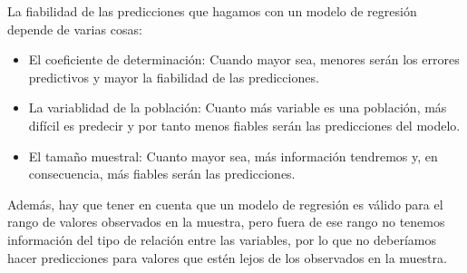 La fiabilidad de las predicciones que hagamos con un modelo de regresión depende de varias cosas:
\begin{itemize}
\item El coeficiente de determinación: Cuando mayor sea, menores serán los errores predictivos y mayor la fiabilidad de las predicciones.
\item La variablidad de la población: Cuanto más variable es una población, más difícil es predecir y por tanto menos fiables serán las predicciones del modelo.
\item El tamaño muestral: Cuanto mayor sea, más información tendremos y, en consecuencia, más fiables serán las predicciones. 
\end{itemize} 

Además, hay que tener en cuenta que un modelo de regresión es válido para el
rango de valores observados en la muestra, pero fuera de ese rango no tenemos
información del tipo de relación entre las variables, por lo que no deberíamos
hacer predicciones para valores que estén lejos de los observados en la
muestra.

\clearpage
\newpage




